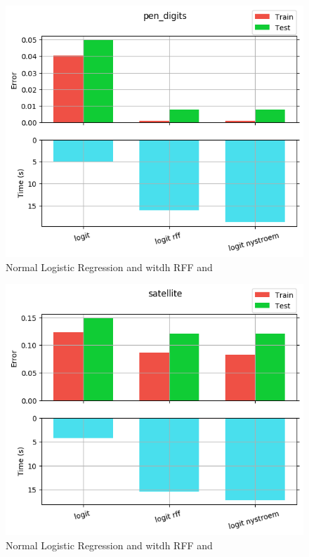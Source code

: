 \begin{figure}[th]
\centering
\includegraphics[scale=\imgscale]{Figures/2_1/pen_digits}
\decoRule
\caption[2.1 pen\tu digits]{Normal Logistic Regression and witdh RFF and \Nys}
\label{fig:2_1_pen_digits}
\end{figure}

\begin{figure}[th]
\centering
\includegraphics[scale=\imgscale]{Figures/2_1/satellite}
\decoRule
\caption[2.1 satellite]{Normal Logistic Regression and witdh RFF and \Nys}
\label{fig:2_1_satellite}
\end{figure}

